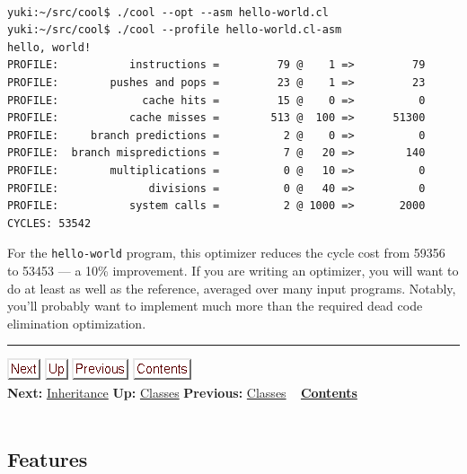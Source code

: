 \documentclass[]{article}
\begin{document}
\begin{verbatim}
 
yuki:~/src/cool$ ./cool --opt --asm hello-world.cl
yuki:~/src/cool$ ./cool --profile hello-world.cl-asm 
hello, world!
PROFILE:           instructions =         79 @    1 =>         79
PROFILE:        pushes and pops =         23 @    1 =>         23
PROFILE:             cache hits =         15 @    0 =>          0
PROFILE:           cache misses =        513 @  100 =>      51300
PROFILE:     branch predictions =          2 @    0 =>          0
PROFILE:  branch mispredictions =          7 @   20 =>        140
PROFILE:        multiplications =          0 @   10 =>          0
PROFILE:              divisions =          0 @   40 =>          0
PROFILE:           system calls =          2 @ 1000 =>       2000
CYCLES: 53542
\end{verbatim}

For the \texttt{hello-world} program, this optimizer reduces the cycle
cost from 59356 to 53453 --- a 10\% improvement. If you are writing an
optimizer, you will want to do at least as well as the reference,
averaged over many input programs. Notably, you'll probably want to
implement much more than the required dead code elimination
optimization.

\begin{center}\rule{3in}{0.4pt}\end{center}

\href{node6.html}{\includegraphics{next.png}}
\href{node4.html}{\includegraphics{up.png}}
\href{node4.html}{\includegraphics{prev.png}}
\href{node1.html}{\includegraphics{contents.png}} \\ \textbf{Next:}
\href{node6.html}{Inheritance} \textbf{Up:} \href{node4.html}{Classes}
\textbf{Previous:} \href{node4.html}{Classes} ~
\textbf{\href{node1.html}{Contents}} \\ \\

\subsection{Features}
\end{document}
